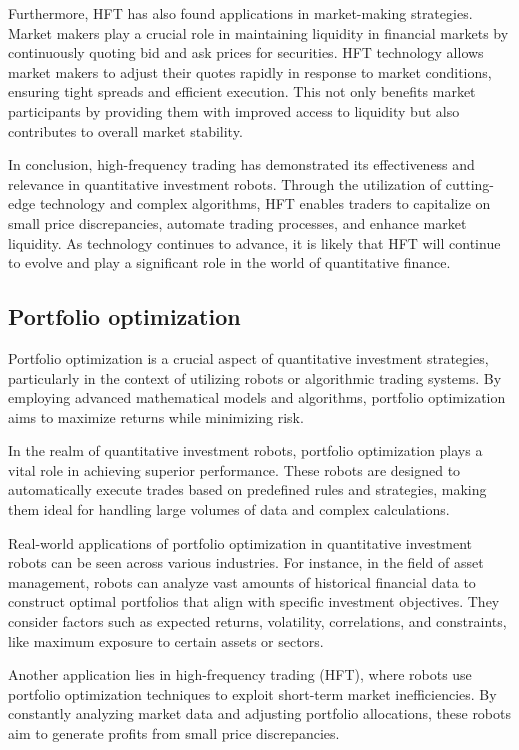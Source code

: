 \documentclass[UTF8]{ctexart}
\begin{document}
Furthermore, HFT has also found applications in market-making strategies. Market makers play a crucial role in maintaining liquidity in financial markets by continuously quoting bid and ask prices for securities. HFT technology allows market makers to adjust their quotes rapidly in response to market conditions, ensuring tight spreads and efficient execution. This not only benefits market participants by providing them with improved access to liquidity but also contributes to overall market stability.

In conclusion, high-frequency trading has demonstrated its effectiveness and relevance in quantitative investment robots. Through the utilization of cutting-edge technology and complex algorithms, HFT enables traders to capitalize on small price discrepancies, automate trading processes, and enhance market liquidity. As technology continues to advance, it is likely that HFT will continue to evolve and play a significant role in the world of quantitative finance.

\subsection{Portfolio optimization}
Portfolio optimization is a crucial aspect of quantitative investment strategies, particularly in the context of utilizing robots or algorithmic trading systems. By employing advanced mathematical models and algorithms, portfolio optimization aims to maximize returns while minimizing risk.

In the realm of quantitative investment robots, portfolio optimization plays a vital role in achieving superior performance. These robots are designed to automatically execute trades based on predefined rules and strategies, making them ideal for handling large volumes of data and complex calculations.

Real-world applications of portfolio optimization in quantitative investment robots can be seen across various industries. For instance, in the field of asset management, robots can analyze vast amounts of historical financial data to construct optimal portfolios that align with specific investment objectives. They consider factors such as expected returns, volatility, correlations, and constraints, like maximum exposure to certain assets or sectors.

Another application lies in high-frequency trading (HFT), where robots use portfolio optimization techniques to exploit short-term market inefficiencies. By constantly analyzing market data and adjusting portfolio allocations, these robots aim to generate profits from small price discrepancies.
\end{document}
